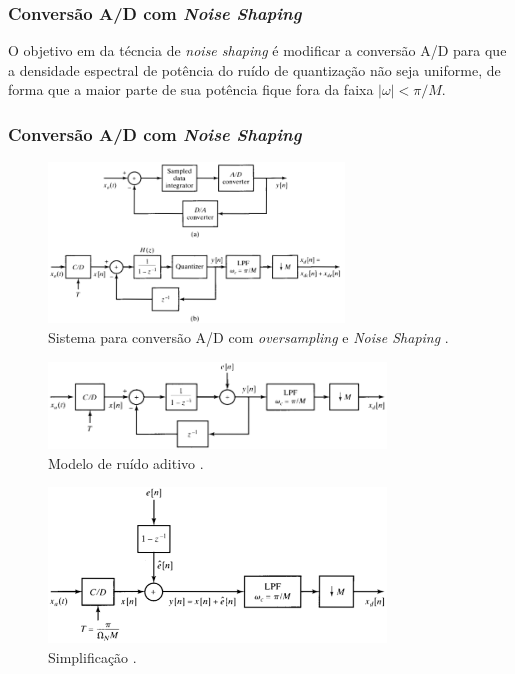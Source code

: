 \begin{frame}%
  \frametitle{Conversão A/D com \textit{Noise Shaping}}
  O objetivo em da técncia de \textit{noise shaping} é modificar a conversão A/D para que a 
  densidade espectral de potência do ruído de quantização não seja uniforme, de forma que 
  a maior parte de sua potência fique fora da faixa $|\omega| < \pi/M$.
\end{frame}

\begin{frame}[allowframebreaks]
  \frametitle{Conversão A/D com \textit{Noise Shaping}}
  \begin{figure}[h!]
  \centering
  \includegraphics[width=0.7\textwidth]{images/oppenheim_fig461.png}
  \caption{Sistema para conversão A/D com \textit{oversampling} e \textit{Noise Shaping} \citep{oppenheim2009}.}
  \label{fig:oppenheim_fig461}
  \end{figure}
 
  \framebreak

  \begin{figure}[h!]
  \centering
  \includegraphics[width=0.8\textwidth]{images/oppenheim_fig462.png}
  \caption{Modelo de ruído aditivo \citep{oppenheim2009}.}
  \label{fig:oppenheim_fig462}
  \end{figure}

  \framebreak

  \begin{figure}[h!]
  \centering
  \includegraphics[width=0.8\textwidth]{images/oppenheim_fig463.png}
  \caption{Simplificação \citep{oppenheim2009}.}
  \label{fig:oppenheim_fig463}
  \end{figure}


\end{frame}
